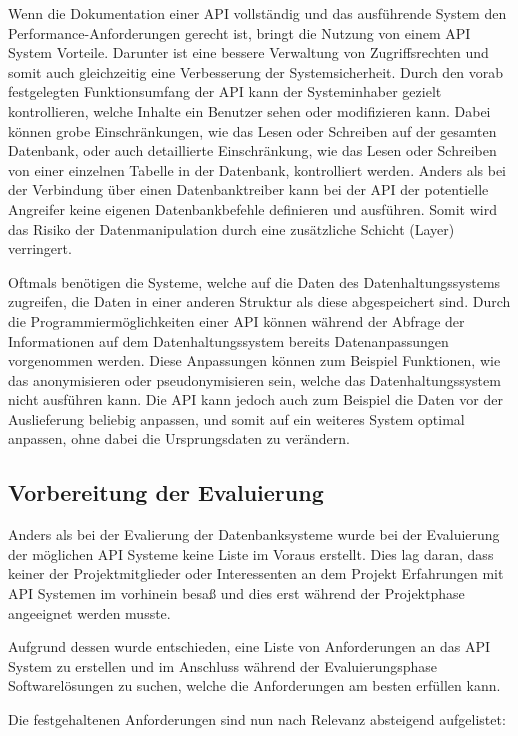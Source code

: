Wenn die Dokumentation einer API vollständig und das ausführende System den
Performance-Anforderungen gerecht ist, bringt die Nutzung von einem API System
Vorteile. Darunter ist eine bessere Verwaltung von Zugriffsrechten und somit
auch gleichzeitig eine Verbesserung der Systemsicherheit. Durch den vorab
festgelegten Funktionsumfang der API kann der Systeminhaber gezielt
kontrollieren, welche Inhalte ein Benutzer sehen oder modifizieren kann. Dabei
können grobe Einschränkungen, wie das Lesen oder Schreiben auf der gesamten
Datenbank, oder auch detaillierte Einschränkung, wie das Lesen oder Schreiben
von einer einzelnen Tabelle in der Datenbank, kontrolliert werden. Anders als
bei der Verbindung über einen Datenbanktreiber kann bei der API der potentielle
Angreifer keine eigenen Datenbankbefehle definieren und ausführen. Somit wird
das Risiko der Datenmanipulation durch eine zusätzliche Schicht (Layer)
verringert.

Oftmals benötigen die Systeme, welche auf die Daten des Datenhaltungssystems
zugreifen, die Daten in einer anderen Struktur als diese abgespeichert sind.
Durch die Programmiermöglichkeiten einer API können während der Abfrage der
Informationen auf dem Datenhaltungssystem bereits Datenanpassungen vorgenommen
werden. Diese Anpassungen können zum Beispiel Funktionen, wie das anonymisieren
oder pseudonymisieren sein, welche das Datenhaltungssystem nicht ausführen
kann. Die API kann jedoch auch zum Beispiel die Daten vor der Auslieferung
beliebig anpassen, und somit auf ein weiteres System optimal anpassen, ohne
dabei die Ursprungsdaten zu verändern.
\nl%

\subsection{Vorbereitung der Evaluierung}
\label{subsec:api_vorbereitung_der_evaluierung}
Anders als bei der Evalierung der Datenbanksysteme wurde bei der Evaluierung
der möglichen API Systeme keine Liste im Voraus erstellt. Dies lag daran, dass
keiner der Projektmitglieder oder Interessenten an dem Projekt Erfahrungen mit
API Systemen im vorhinein besaß und dies erst während der Projektphase
angeeignet werden musste.

Aufgrund dessen wurde entschieden, eine Liste von Anforderungen an das
API System zu erstellen und im Anschluss während der Evaluierungsphase
Softwarelösungen zu suchen, welche die Anforderungen am besten erfüllen kann.

Die festgehaltenen Anforderungen sind nun nach Relevanz absteigend aufgelistet:

